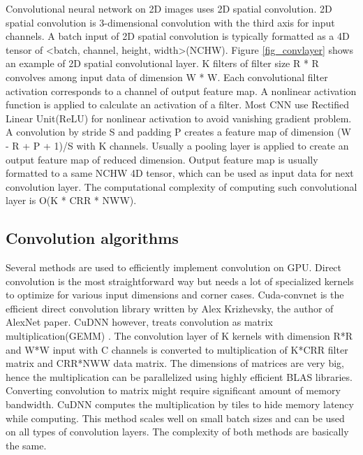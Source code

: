 Convolutional neural network on 2D images uses 2D spatial convolution.
2D spatial convolution is 3-dimensional convolution with the third axis for input channels.
A batch input of 2D spatial convolution is typically formatted as a 4D tensor of <batch, channel, height, width>(NCHW).
Figure \ref{fig_convlayer} shows an example of 2D spatial convolutional layer.
K filters of filter size R * R convolves among input data of dimension W * W.
Each convolutional filter activation corresponds to a channel of output feature map.
A nonlinear activation function is applied to calculate an activation of a filter.
Most CNN use Rectified Linear Unit(ReLU) for nonlinear activation to avoid vanishing gradient problem\cite{rectified}.
A convolution by stride S and padding P creates a feature map of dimension (W - R + P + 1)/S with K channels.
Usually a pooling layer is applied to create an output feature map of reduced dimension.
Output feature map is usually formatted to a same NCHW 4D tensor, which can be used as input data for next convolution layer.
The computational complexity of computing such convolutional layer is O(K * CRR * NWW).

\subsection{Convolution algorithms}
Several methods are used to efficiently implement convolution on GPU.
Direct convolution is the most straightforward way but needs a lot of specialized kernels to optimize for various input dimensions and corner cases.
Cuda-convnet \cite{cuda-convnet} is the efficient direct convolution library written by Alex Krizhevsky, the author of AlexNet paper.
CuDNN however, treats convolution as matrix multiplication(GEMM) \cite{cudnn}.
The convolution layer of K kernels with dimension R*R and W*W input with C channels is converted to multiplication of K*CRR filter matrix and CRR*NWW data matrix.
The dimensions of matrices are very big, hence the multiplication can be parallelized using highly efficient BLAS libraries.
Converting convolution to matrix might require significant amount of memory bandwidth.
CuDNN computes the multiplication by tiles to hide memory latency while computing.
This method scales well on small batch sizes and can be used on all types of convolution layers.
The complexity of both methods are basically the same.

